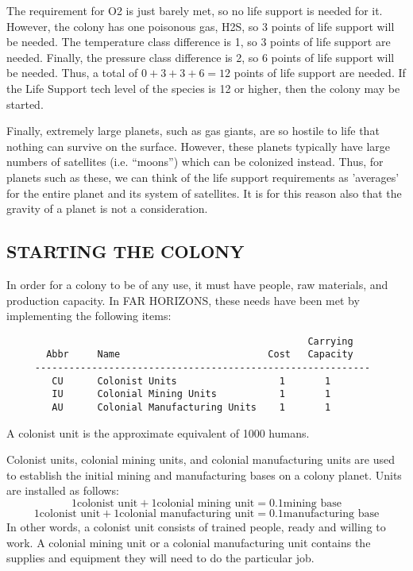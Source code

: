 \documentclass[10pt,titlepage]{article}
\begin{document}
The requirement for O2 is just barely met, so no life support is needed for it.
However, the colony has one poisonous gas, H2S, so 3 points of life support
will be needed.  The temperature class difference is 1, so 3 points of life
support are needed.  Finally, the pressure class difference is 2, so 6 points
of life support will be needed.  Thus, a total of $0+3+3+6 = 12$ points of life
support are needed.  If the Life Support tech level of the species is 12 or
higher, then the colony may be started.

Finally, extremely large planets, such as gas giants, are so hostile to life
that nothing can survive on the surface.  However, these planets typically have
large numbers of satellites (i.e. ``moons'') which can be colonized instead.
Thus, for planets such as these, we can think of the life support requirements
as 'averages' for the entire planet and its system of satellites.  It is for
this reason also that the gravity of a planet is not a consideration.


\subsection{STARTING THE COLONY}
\label{sec:startingthecolony}


In order for a colony to be of any use, it must have people, raw materials,
and production capacity.  In FAR HORIZONS, these needs have been met by
implementing the following items:

\begin{verbatim}
                                                     Carrying
       Abbr     Name                          Cost   Capacity
     -----------------------------------------------------------
        CU      Colonist Units                  1       1
        IU      Colonial Mining Units           1       1
        AU      Colonial Manufacturing Units    1       1\end{verbatim} 


A colonist unit is the approximate equivalent of 1000 humans.

Colonist units, colonial mining units, and colonial manufacturing units are
used to establish the initial mining and manufacturing bases on a colony
planet.  Units are installed as follows:
\[
    1 \textrm{colonist unit} + 1 \textrm{colonial mining unit} = 0.1 \textrm{mining base}
\]
\[
    1 \textrm{colonist unit} + 1 \textrm{colonial manufacturing unit} = 0.1 \textrm{manufacturing base}
\]
In other words, a colonist unit consists of trained people, ready and willing
to work.  A colonial mining unit or a colonial manufacturing unit contains the
supplies and equipment they will need to do the particular job.
\end{document}
